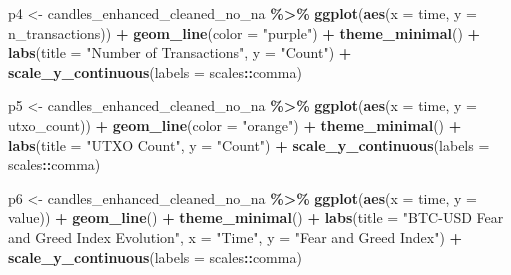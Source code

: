 \documentclass[
]{article}
\newenvironment{Shaded}{\begin{snugshade}}{\end{snugshade}}
\newcommand{\AttributeTok}[1]{\textcolor[rgb]{0.13,0.29,0.53}{#1}}
\newcommand{\FunctionTok}[1]{\textcolor[rgb]{0.13,0.29,0.53}{\textbf{#1}}}
\newcommand{\NormalTok}[1]{#1}
\newcommand{\OtherTok}[1]{\textcolor[rgb]{0.56,0.35,0.01}{#1}}
\newcommand{\SpecialCharTok}[1]{\textcolor[rgb]{0.81,0.36,0.00}{\textbf{#1}}}
\newcommand{\StringTok}[1]{\textcolor[rgb]{0.31,0.60,0.02}{#1}}
\begin{document}
\begin{Shaded}
\begin{Highlighting}[]
\NormalTok{p4 }\OtherTok{\textless{}{-}}\NormalTok{ candles\_enhanced\_cleaned\_no\_na }\SpecialCharTok{\%\textgreater{}\%}
    \FunctionTok{ggplot}\NormalTok{(}\FunctionTok{aes}\NormalTok{(}\AttributeTok{x =}\NormalTok{ time, }\AttributeTok{y =}\NormalTok{ n\_transactions)) }\SpecialCharTok{+} \FunctionTok{geom\_line}\NormalTok{(}\AttributeTok{color =} \StringTok{"purple"}\NormalTok{) }\SpecialCharTok{+}
    \FunctionTok{theme\_minimal}\NormalTok{() }\SpecialCharTok{+} \FunctionTok{labs}\NormalTok{(}\AttributeTok{title =} \StringTok{"Number of Transactions"}\NormalTok{,}
    \AttributeTok{y =} \StringTok{"Count"}\NormalTok{) }\SpecialCharTok{+} \FunctionTok{scale\_y\_continuous}\NormalTok{(}\AttributeTok{labels =}\NormalTok{ scales}\SpecialCharTok{::}\NormalTok{comma)}

\NormalTok{p5 }\OtherTok{\textless{}{-}}\NormalTok{ candles\_enhanced\_cleaned\_no\_na }\SpecialCharTok{\%\textgreater{}\%}
    \FunctionTok{ggplot}\NormalTok{(}\FunctionTok{aes}\NormalTok{(}\AttributeTok{x =}\NormalTok{ time, }\AttributeTok{y =}\NormalTok{ utxo\_count)) }\SpecialCharTok{+} \FunctionTok{geom\_line}\NormalTok{(}\AttributeTok{color =} \StringTok{"orange"}\NormalTok{) }\SpecialCharTok{+}
    \FunctionTok{theme\_minimal}\NormalTok{() }\SpecialCharTok{+} \FunctionTok{labs}\NormalTok{(}\AttributeTok{title =} \StringTok{"UTXO Count"}\NormalTok{, }\AttributeTok{y =} \StringTok{"Count"}\NormalTok{) }\SpecialCharTok{+}
    \FunctionTok{scale\_y\_continuous}\NormalTok{(}\AttributeTok{labels =}\NormalTok{ scales}\SpecialCharTok{::}\NormalTok{comma)}

\NormalTok{p6 }\OtherTok{\textless{}{-}}\NormalTok{ candles\_enhanced\_cleaned\_no\_na }\SpecialCharTok{\%\textgreater{}\%}
    \FunctionTok{ggplot}\NormalTok{(}\FunctionTok{aes}\NormalTok{(}\AttributeTok{x =}\NormalTok{ time, }\AttributeTok{y =}\NormalTok{ value)) }\SpecialCharTok{+} \FunctionTok{geom\_line}\NormalTok{() }\SpecialCharTok{+} \FunctionTok{theme\_minimal}\NormalTok{() }\SpecialCharTok{+}
    \FunctionTok{labs}\NormalTok{(}\AttributeTok{title =} \StringTok{"BTC{-}USD Fear and Greed Index Evolution"}\NormalTok{, }\AttributeTok{x =} \StringTok{"Time"}\NormalTok{,}
        \AttributeTok{y =} \StringTok{"Fear and Greed Index"}\NormalTok{) }\SpecialCharTok{+} \FunctionTok{scale\_y\_continuous}\NormalTok{(}\AttributeTok{labels =}\NormalTok{ scales}\SpecialCharTok{::}\NormalTok{comma)}


\end{Highlighting}
\end{Shaded}
\end{document}
